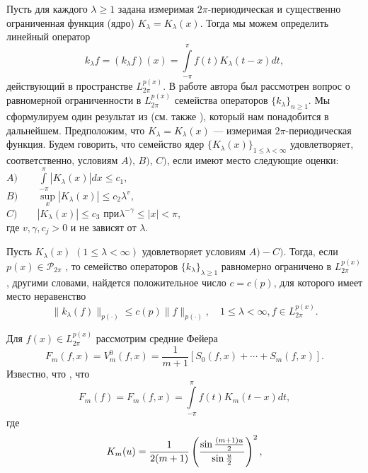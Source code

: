 Пусть для каждого $\lambda\geq1$ задана измеримая
 $2\pi$-периодическая и существенно ограниченная  функция (ядро)
 $K_{\lambda}=K_{\lambda}(x)$. Тогда мы можем определить линейный
 оператор
  \begin{equation}\label{vpmshii4.2}
    k_{\lambda}f=(k_{\lambda}f)(x)=\int\limits_{-\pi}^{\pi}f(t)K_{\lambda}(t-x)dt,
 \end{equation}
действующий в пространстве $L_{2\pi}^{p(x)}$. В работе автора \cite{vpmshiiShar5} был рассмотрен
 вопрос о равномерной ограниченности в $L^{p(x)}_{2\pi}$
семейства операторов $\{k_{\lambda}\}_{n\geq1}$.   Мы сформулируем один результат из \cite{vpmshiiShar5} (см. также \cite{shiimonog}), который нам понадобится в дальнейшем.
Предположим, что $K_{\lambda}=K_{\lambda}(x)$ ---
измеримая $2\pi$-периодическая функция. Будем говорить, что
семейство ядер $\{K_{\lambda}(x)\}_{1\leq\lambda<\infty}$
удовлетворяет, соответственно, условиям $A)$, $B)$, $C)$, если имеют
место следующие оценки:\\
$A)\qquad\int\limits_{-\pi}^{\pi}|K_{\lambda}(x)|dx\le c_{1},$\\
$B)\qquad\sup\limits_{x}|K_{\lambda}(x)|\leq c_{2}\lambda^{v},$\\
$C)\qquad|K_{\lambda}(x)|\leq c_{3}\text{ при
}\lambda^{-\gamma}\leq|x|<\pi$,\\
где $v,\gamma, c_{j}>0$ и не зависят от $\lambda$.
\begin{theorem}\label{vpmshiit A}
 Пусть $K_{\lambda}(x)$
$(1\leq\lambda<\infty)$ удовлетворяет условиям $A) - C)$. Тогда,
если $ p(x)\in \mathcal{ P}_{2\pi} $ ,  то семейство операторов $\{k_{\lambda}\}_{\lambda\geq1}$ равномерно
ограничено в $L_{2\pi}^{p(x)}$, другими словами, найдется положительное число $c=c(p)$, для которого имеет место неравенство
$$
 \|k_{\lambda}(f)\|_{p(\cdot)}\le c(p)\|f\|_{p(\cdot)},\quad 1\leq\lambda<\infty, f\in L_{2\pi}^{p(x)}.
 $$
\end{theorem}
Для $f(x)\in L_{2\pi}^{p(x)}$  рассмотрим средние Фейера
\begin{equation}\label{vpmshii4.3}
    F_m(f,x)=V_m^0(f,x)=\frac1{m+1}[S_0(f,x)+\cdots+S_{m}(f,x)].
\end{equation}
Известно, что \cite{Zigmund1}, что
\begin{equation}\label{vpmshii4.4}
    F_m(f)=F_m(f,x)=\int\limits_{-\pi}^{\pi}f(t)K_{m}(t-x)dt,
\end{equation}
где
\begin{equation}\label{vpmshii4.5}
    K_{m}(u)=\frac1{2(m+1)}\left({\sin  \frac{(m+1)u}{2}\over\sin \frac{u}{2}}\right)^2,
\end{equation}
